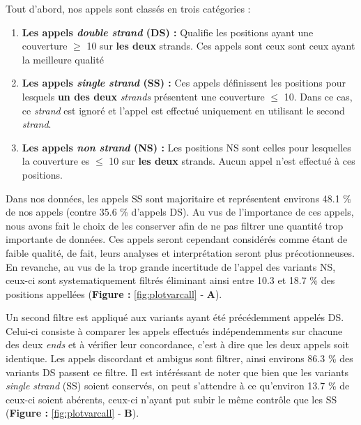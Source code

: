 \documentclass[12pt,twoside]{reedthesis}
\providecommand{\tightlist}{%
  \setlength{\itemsep}{0pt}\setlength{\parskip}{0pt}}
\theoremstyle{definition}
\theoremstyle{definition}
\theoremstyle{remark}
\begin{document}
  Tout d'abord, nos appels sont classés en trois catégories :
  
  \begin{enumerate}
  \def\labelenumi{\arabic{enumi}.}
  \tightlist
  \item
    \textbf{Les appels \emph{double strand} (DS) :} Qualifie les positions
    ayant une couverture \(\ge\) 10 sur \textbf{les deux} strands. Ces
    appels sont ceux sont ceux ayant la meilleure qualité
  \item
    \textbf{Les appels \emph{single strand} (SS) :} Ces appels définissent
    les positions pour lesquels \textbf{un des deux} \emph{strands}
    présentent une couverture \(\le\) 10. Dans ce cas, ce \emph{strand}
    est ignoré et l'appel est effectué uniquement en utilisant le second
    \emph{strand}.\\
  \item
    \textbf{Les appels \emph{non strand} (NS) :} Les positions NS sont
    celles pour lesquelles la couverture es \(\le\) 10 sur \textbf{les
    deux} strands. Aucun appel n'est effectué à ces positions.
  \end{enumerate}
  
  Dans nos données, les appels SS sont majoritaire et représentent
  environs 48.1 \% de nos appels (contre 35.6 \% d'appels DS). Au vus de
  l'importance de ces appels, nous avons fait le choix de les conserver
  afin de ne pas filtrer une quantité trop importante de données. Ces
  appels seront cependant considérés comme étant de faible qualité, de
  fait, leurs analyses et interprétation seront plus précotionneuses. En
  revanche, au vus de la trop grande incertitude de l'appel des variants
  NS, ceux-ci sont systematiquement filtrés éliminant ainsi entre 10.3 et
  18.7 \% des positions appellées (\textbf{Figure : }\ref{fig:plotvarcall}
  - \textbf{A}).
  
  Un second filtre est appliqué aux variants ayant été précédemment
  appelés DS. Celui-ci consiste à comparer les appels effectués
  indépendemments sur chacune des deux \emph{ends} et à vérifier leur
  concordance, c'est à dire que les deux appels soit identique. Les appels
  discordant et ambigus sont filtrer, ainsi environs 86.3 \% des variants
  DS passent ce filtre. Il est intéréssant de noter que bien que les
  variants \emph{single strand} (SS) soient conservés, on peut s'attendre
  à ce qu'environ 13.7 \% de ceux-ci soient abérents, ceux-ci n'ayant put
  subir le même contrôle que les SS (\textbf{Figure :
  }\ref{fig:plotvarcall} - \textbf{B}).
  
\end{document}
